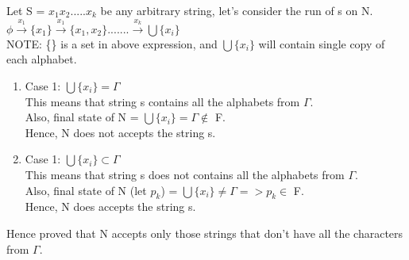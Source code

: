 \documentclass{article}
\begin{document}
    Let S = $x_1 x_2 ..... x_k$ be any arbitrary string, let's consider the run of s on N.\\
    $\phi \xrightarrow{x_1} \{x_1\} \xrightarrow{x_1} \{x_1,x_2\} ....... \xrightarrow{x_k} \bigcup \{x_i\}$\\
    NOTE: \{\} is a set in above expression, and $\bigcup \{x_i\}$ will contain single copy of each alphabet.\\
    \begin{enumerate}
        \item Case 1: $\bigcup \{x_i\} = \Gamma$ \\
        This means that string s contains all the alphabets from $\Gamma $.\\
        Also, final state of N = $\bigcup \{x_i\} = \Gamma \notin $ F.\\
        Hence, N does not accepts the string s.
        \pagebreak
        \item Case 1: $\bigcup \{x_i\} \subset \Gamma$ \\
        This means that string s does not contains all the alphabets from $\Gamma $.\\
        Also, final state of N (let $p_k$) = $\bigcup \{x_i\} \neq \Gamma => p_k \in $ F.\\
        Hence, N does accepts the string s.\\
    \end{enumerate}

Hence proved that N accepts only those strings that don't have all the characters from $\Gamma $.\\
\pagebreak
\end{document}
